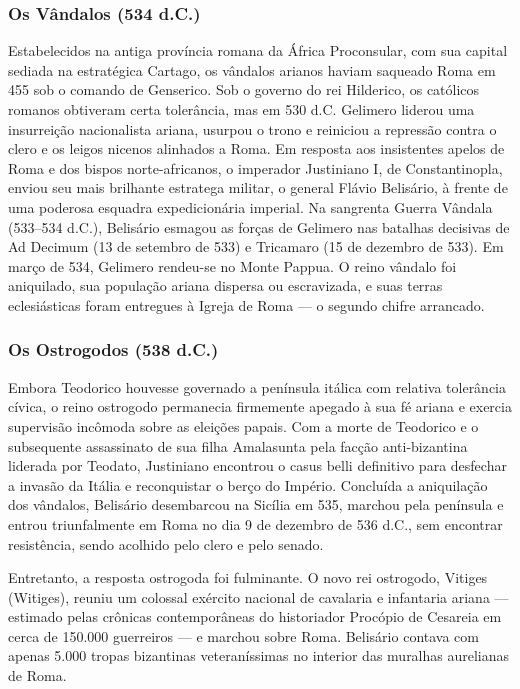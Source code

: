 \subsubsection*{Os Vândalos (534 d.C.)}
Estabelecidos na antiga província romana da África Proconsular, com sua capital sediada na estratégica Cartago, os vândalos arianos haviam saqueado Roma em 455 sob o comando de Genserico. Sob o governo do rei Hilderico, os católicos romanos obtiveram certa tolerância, mas em 530 d.C. Gelimero liderou uma insurreição nacionalista ariana, usurpou o trono e reiniciou a repressão contra o clero e os leigos nicenos alinhados a Roma. Em resposta aos insistentes apelos de Roma e dos bispos norte-africanos, o imperador Justiniano I, de Constantinopla, enviou seu mais brilhante estratega militar, o general Flávio Belisário, à frente de uma poderosa esquadra expedicionária imperial. Na sangrenta Guerra Vândala (533–534 d.C.), Belisário esmagou as forças de Gelimero nas batalhas decisivas de Ad Decimum (13 de setembro de 533) e Tricamaro (15 de dezembro de 533). Em março de 534, Gelimero rendeu-se no Monte Pappua. O reino vândalo foi aniquilado, sua população ariana dispersa ou escravizada, e suas terras eclesiásticas foram entregues à Igreja de Roma — o segundo chifre arrancado.


\subsubsection*{Os Ostrogodos (538 d.C.)}
Embora Teodorico houvesse governado a península itálica com relativa tolerância cívica, o reino ostrogodo permanecia firmemente apegado à sua fé ariana e exercia supervisão incômoda sobre as eleições papais. Com a morte de Teodorico e o subsequente assassinato de sua filha Amalasunta pela facção anti-bizantina liderada por Teodato, Justiniano encontrou o casus belli definitivo para desfechar a invasão da Itália e reconquistar o berço do Império. Concluída a aniquilação dos vândalos, Belisário desembarcou na Sicília em 535, marchou pela península e entrou triunfalmente em Roma no dia 9 de dezembro de 536 d.C., sem encontrar resistência, sendo acolhido pelo clero e pelo senado.

Entretanto, a resposta ostrogoda foi fulminante. O novo rei ostrogodo, Vitiges (Witiges), reuniu um colossal exército nacional de cavalaria e infantaria ariana — estimado pelas crônicas contemporâneas do historiador Procópio de Cesareia em cerca de 150.000 guerreiros — e marchou sobre Roma. Belisário contava com apenas 5.000 tropas bizantinas veteraníssimas no interior das muralhas aurelianas de Roma.

